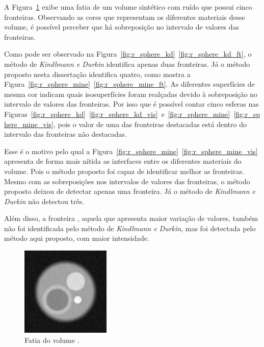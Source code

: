 	A Figura~\ref{fig:r_sphere_slice} exibe uma fatia de um volume sintético com ruído que possui cinco fronteiras. Observando as cores que representam os diferentes materiais desse volume, é possível perceber que há sobreposição no intervalo de valores das fronteiras.
	
	Como pode ser observado na Figura~\ref{fig:r_sphere_kd}~\ref{fig:r_sphere_kd_ft}, o método de \textit{Kindlmann e Durkin} identifica apenas duas fronteiras. Já o método proposto nesta dissertação identifica quatro, como mostra a Figura~\ref{fig:r_sphere_mine}~\ref{fig:r_sphere_mine_ft}. As diferentes superfícies de mesma cor indicam quais isosuperfícies foram realçadas devido à sobreposição no intervalo de valores das fronteiras. Por isso que é possível contar cinco esferas nas Figuras~\ref{fig:r_sphere_kd}~\ref{fig:r_sphere_kd_vis}~e~\ref{fig:r_sphere_mine}~\ref{fig:r_sphere_mine_vis}, pois o valor de uma das fronteiras destacadas está dentro do intervalo das fronteiras não destacadas.
	
	Esse é o motivo pelo qual a Figura~\ref{fig:r_sphere_mine}~\ref{fig:r_sphere_mine_vis} apresenta de forma mais nítida as interfaces entre os diferentes materiais do volume. Pois o método proposto foi capaz de identificar melhor as fronteiras. Mesmo com as sobreposições nos intervalos de valores das fronteiras, o método proposto deixou de detectar apenas uma fronteira. Já o método de \textit{Kindlmann e Durkin} não detectou três.
	
	Além disso, a fronteira , aquela que apresenta maior variação de valores, também não foi identificada pelo método de \textit{Kindlmann e Durkin}, mas foi detectada pelo método aqui proposto, com maior intensidade.
	
\begin{figure}[h]
	\centering
	\includegraphics[width=0.38\textwidth]{images/r_3sphere_slice}
	\caption{Fatia do volume .}
	\label{fig:r_sphere_slice}
\end{figure}

